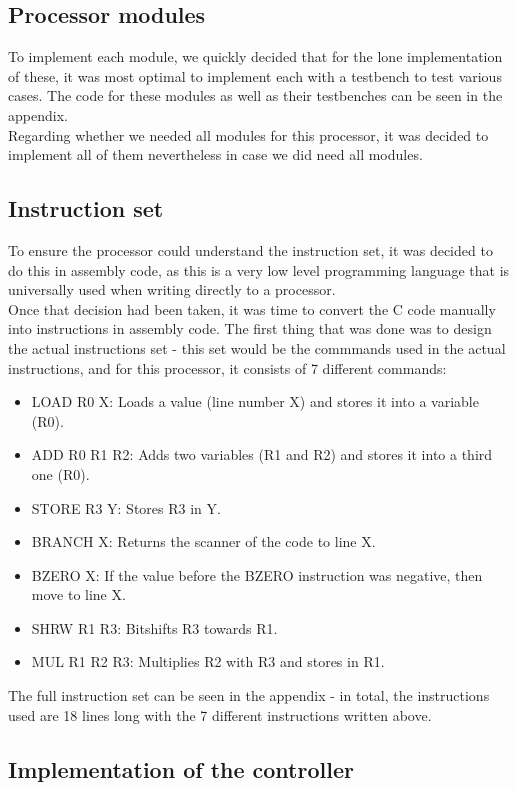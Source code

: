 \documentclass[12pt,a4paper]{article}
\begin{document}
\subsection{Processor modules}
	To implement each module, we quickly decided that for the lone implementation of these, it was most optimal to implement each with a testbench to test various cases. The code for these modules as well as their testbenches can be seen in the appendix.\\
	Regarding whether we needed all modules for this processor, it was decided to implement all of them nevertheless in case we did need all modules.\\
	
\subsection{Instruction set}
	To ensure the processor could understand the instruction set, it was decided to do this in assembly code, as this is a very low level programming language that is universally used when writing directly to a processor.\\
	Once that decision had been taken, it was time to convert the C code manually into instructions in assembly code. The first thing that was done was to design the actual instructions set - this set would be the commmands used in the actual instructions, and for this processor, it consists of 7 different commands:\\
	
	\begin{itemize}
			\item LOAD R0 X: Loads a value (line number X) and stores it into a variable (R0).
			\item ADD R0 R1 R2: Adds two variables (R1 and R2) and stores it into a third one (R0).
			\item STORE R3 Y: Stores R3 in Y.
			\item BRANCH X: Returns the scanner of the code to line X.
			\item BZERO X: If the value before the BZERO instruction was negative, then move to line X.
			\item SHRW R1 R3: Bitshifts R3 towards R1.
			\item MUL R1 R2 R3: Multiplies R2 with R3 and stores in R1.
		\end{itemize}
	The full instruction set can be seen in the appendix - in total, the instructions used are 18 lines long with the 7 different instructions written above.
\subsection{Implementation of the controller}
	
\end{document}
